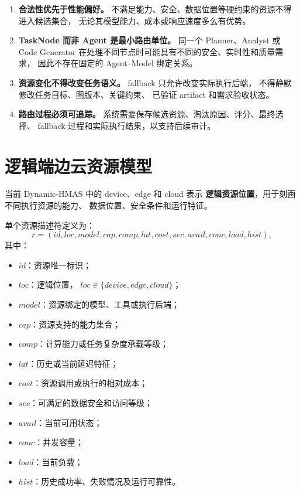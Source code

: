 \documentclass[UTF8,a4paper,12pt,oneside]{ctexbook}
\begin{document}
\begin{enumerate}
    \item \textbf{合法性优先于性能偏好。}
    不满足能力、安全、数据位置等硬约束的资源不得进入候选集合，
    无论其模型能力、成本或响应速度多么有优势。

    \item \textbf{TaskNode 而非 Agent 是最小路由单位。}
    同一个 Planner、Analyst 或 Code Generator
    在处理不同节点时可能具有不同的安全、实时性和质量需求，
    因此不存在固定的 Agent--Model 绑定关系。

    \item \textbf{资源变化不得改变任务语义。}
    fallback 只允许改变实际执行后端，
    不得静默修改任务目标、图版本、关键约束、
    已验证 artifact 和需求验收状态。

    \item \textbf{路由过程必须可追踪。}
    系统需要保存候选资源、淘汰原因、评分、最终选择、
    fallback 过程和实际执行结果，以支持后续审计。
\end{enumerate}


\section{逻辑端边云资源模型}

当前 Dynamic-HMAS 中的 device、edge 和 cloud 表示
\textbf{逻辑资源位置}，用于刻画不同执行资源的能力、
数据位置、安全条件和运行特征。

单个资源描述符定义为：
\[
r=
(
id,
loc,
model,
cap,
comp,
lat,
cost,
sec,
avail,
conc,
load,
hist
),
\]
其中：

\begin{itemize}
    \item $id$：资源唯一标识；
    \item $loc$：逻辑位置，
    $loc\in\{device,edge,cloud\}$；
    \item $model$：资源绑定的模型、工具或执行后端；
    \item $cap$：资源支持的能力集合；
    \item $comp$：计算能力或任务复杂度承载等级；
    \item $lat$：历史或当前延迟特征；
    \item $cost$：资源调用或执行的相对成本；
    \item $sec$：可满足的数据安全和访问等级；
    \item $avail$：当前可用状态；
    \item $conc$：并发容量；
    \item $load$：当前负载；
    \item $hist$：历史成功率、失败情况及运行可靠性。
\end{itemize}
\end{document}
